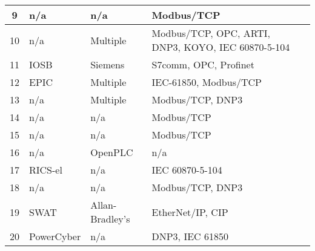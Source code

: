 \begin{longtable}[c]{|c|l|p{}|p{}|p{}|}
	9            & n/a           & n/a                              & Modbus/TCP                                         & \cite{15-testbed-SCADA-atack}                      \\ \hline
	10           & n/a           & Multiple                         & Modbus/TCP, OPC, ARTI, DNP3, KOYO, IEC 60870-5-104 & \cite{17-SCADA-testbed}                            \\ \hline
	11           & IOSB          & Siemens                          & S7comm, OPC, Profinet                          & \cite{22-ICS-testbed-design-and-architect}         \\ \hline
	12           & EPIC          & Multiple                         & IEC-61850, Modbus/TCP                              & \cite{25-testbed-EPIC}                             \\ \hline
	13           & n/a          & Multiple                         & Modbus/TCP, DNP3                                   & \cite{26-springer-testbeds}                        \\ \hline
	14           & n/a           & n/a                              & Modbus/TCP                                         & \cite{27-integrated-testbed-for-SCADA-monitoring}  \\ \hline
	15           & n/a           & n/a                              & Modbus/TCP                                         & \cite{28-testbed-road-infra}                       \\ \hline
	16           & n/a           & OpenPLC                          & n/a                                            & \cite{31-springer-plc-and-iot-in-virtual-testbed}  \\ \hline
	17           & RICS-el       & n/a                              & IEC 60870-5-104                                & \cite{32-springer-scada-testbed-research-training} \\ \hline
	18           & n/a           & n/a                              & Modbus/TCP, DNP3                                   & \cite{33-SCADA-virtual-testbed}                    \\ \hline
	19           & SWAT          & Allan-Bradley's                 & EtherNet/IP, CIP                               & \cite{34-ieee-swat-ics-testbed}                    \\ \hline
	20           & PowerCyber    & n/a                              & DNP3, IEC 61850                                & \cite{36-SCADA-testbeds-2010}                      \\ \hline

\end{longtable}
